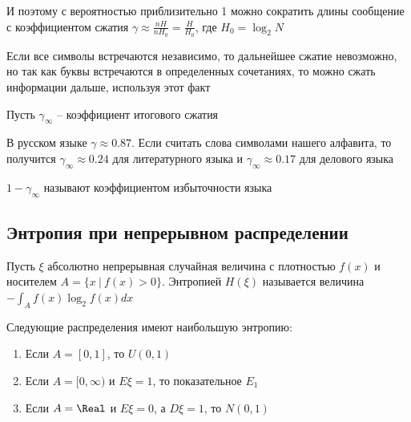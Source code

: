И поэтому с вероятностью приблизительно 1 можно сократить длины сообщение с коэффициентом сжатия $\gamma \approx \frac{nH}{nH_0} = \frac{H}{H_0}$, где $H_0 = \log_2 N$

Если все символы встречаются независимо, то дальнейшее сжатие невозможно, но так как буквы встречаются в определенных сочетаниях, то можно сжать 
информации дальше, используя этот факт

Пусть $\gamma_\infty$ -- коэффициент итогового сжатия


В русском языке $\gamma \approx 0.87$. Если считать слова символами нашего алфавита, 
то получится $\gamma_\infty \approx 0.24$ для литературного языка и
$\gamma_\infty \approx 0.17$ для делового языка

\Def $1 - \gamma_\infty$ называют коэффициентом избыточности языка

\subsection{Энтропия при непрерывном распределении}

\Def Пусть $\xi$ абсолютно непрерывная случайная величина с плотностью $f(x)$ и носителем $A = \{x \ | \ f(x) > 0\}$. Энтропией $H(\xi)$ называется
величина $-\int_A f(x) \log_2 f(x) dx$

\begin{MyTheorem}
    \Ths Следующие распределения имеют наибольшую энтропию:

    \begin{enumerate}
        \item Если $A = [0, 1]$, то $U(0, 1)$

        \item Если $A = [0, \infty)$ и $E\xi = 1$, то показательное $E_1$

        \item Если $A = \Real$ и $E\xi = 0$, а $D\xi = 1$, то $N(0, 1)$
    \end{enumerate}
\end{MyTheorem}

